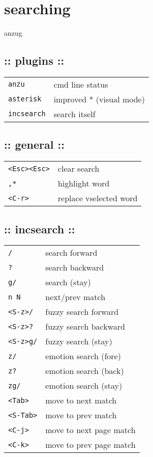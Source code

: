 \section{\hrulefill searching\hrulefill}

anzug
\subsection{:: plugins ::}
\begin{tabular}{@{}ll@{}}
    \verb!anzu!      & cmd line status \\
    \verb!asterisk!  & improved * (visual mode) \\
    \verb!incsearch! & search itself \\
\end{tabular}

\subsection{:: general ::}
\begin{tabular}{@{}ll@{}}
    \verb!<Esc><Esc>!   & clear search \\
    \verb!,*!           & highlight word \\
    \verb!<C-r>!        & replace vselected word \\
\end{tabular}

\subsection{:: incsearch ::}
\begin{tabular}{@{}ll@{}}
    \verb!/!            & search forward \\
    \verb!?!            & search backward \\
    \verb!g/!           & search (stay) \\
    \verb!n N!          & next/prev match \\
    \verb!<S-z>/!       & fuzzy search forward \\
    \verb!<S-z>?!       & fuzzy search backward \\
    \verb!<S-z>g/!      & fuzzy search (stay) \\
    \verb!z/!           & emotion search (fore) \\
    \verb!z?!           & emotion search (back) \\
    \verb!zg/!          & emotion search (stay) \\
    \verb!<Tab>!        & move to next match \\
    \verb!<S-Tab>!      & move to prev match \\
    \verb!<C-j>!        & move to next page match \\
    \verb!<C-k>!        & move to prev page match \\
\end{tabular}

